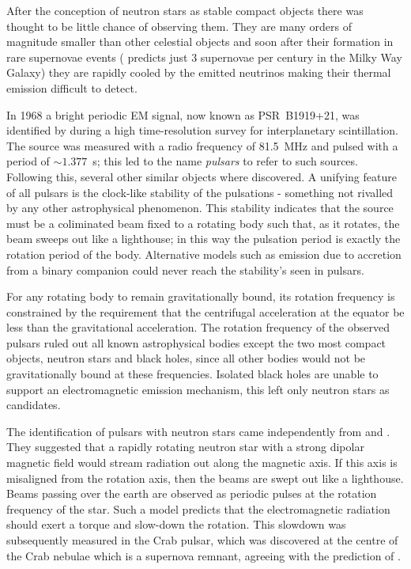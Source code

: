After the conception of neutron stars as stable compact objects there was
thought to be little chance of observing them. They are many orders of
magnitude smaller than other celestial objects and soon after their formation
in rare supernovae events (\citet{van1991} predicts just 3 supernovae per
century in the Milky Way Galaxy)
they are rapidly cooled by the emitted neutrinos
making their thermal emission difficult to detect.

In 1968 a bright periodic EM signal, now known as PSR~B1919+21, was identified
by \citet{Hewish1968} during a high time-resolution survey for interplanetary
scintillation. The source was measured with a radio frequency of 81.5~MHz
and pulsed with a period of $\sim 1.377$~s; this led to the name \emph{pulsars}
to refer to such sources.  Following this, several other similar objects where
discovered. A unifying feature of all pulsars is the clock-like stability of
the pulsations - something not rivalled by any other astrophysical phenomenon.
This stability indicates that the source must be a coliminated beam fixed to a
rotating body such that, as it rotates, the beam sweeps out like a lighthouse;
in this way the pulsation period is exactly the rotation period of the body.
Alternative models such as emission due to accretion from a binary companion
could never reach the stability's seen in pulsars.

For any rotating body to remain gravitationally bound, its rotation frequency is
constrained by the requirement that the centrifugal acceleration at the equator
be less than the gravitational acceleration. The rotation frequency of the observed
pulsars ruled out all known astrophysical bodies except the two most compact
objects, neutron stars and black holes, since all other bodies would not be
gravitationally bound at these frequencies. Isolated black holes are unable to
support an electromagnetic emission mechanism, this left only neutron stars
as candidates.

The identification of pulsars with neutron stars came independently from
\citet{Pacini1967} and \citet{Gold1968}. They suggested that a rapidly rotating
neutron star with a strong dipolar magnetic field would stream radiation out
along the magnetic axis. If this axis is misaligned from the rotation axis,
then the beams are swept out like a lighthouse. Beams passing over the earth
are observed as periodic pulses at the rotation frequency of the star.  Such a
model predicts that the electromagnetic radiation should exert a torque and
slow-down the rotation.  This slowdown was subsequently measured in the Crab
pulsar, which was discovered at the centre of the Crab nebulae which is a
supernova remnant, agreeing with the prediction of \citet{Baade1934}.

